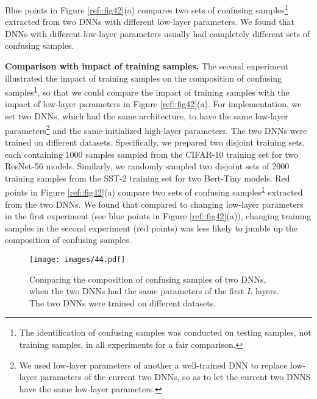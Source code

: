 \documentclass[10pt,twocolumn,letterpaper]{article}
\begin{document}
Blue points in Figure \ref{ref::fig42}(a) compares two sets of confusing samples\footnote[12]{\label{ref::confusing-sample}The identification of confusing samples was conducted on testing samples, not training samples, in all experiments for a fair comparison.} extracted from two DNNs with different low-layer parameters. We found that DNNs with different low-layer parameters usually had completely different sets of confusing samples.


\textbf{Comparison with impact of training samples.} The second experiment illustrated the impact of training samples on the composition of confusing samples\textsuperscript{\ref{ref::confusing-sample}}, so that we could compare the impact of training samples with the impact of low-layer parameters in Figure \ref{ref::fig42}(a).
For implementation, we set two DNNs, which had the same architecture, to have the same low-layer parameters\footnote[13]{\label{ref::fix-a-DNN}We used low-layer parameters of another a well-trained DNN to replace low-layer parameters of the current two DNNs, so as to let the current two DNNS have the same low-layer parameters.} and the same initialized high-layer parameters. The two DNNs were trained on different datasets.
Specifically, we prepared two disjoint training sets, each containing 1000 samples sampled from the CIFAR-10 training set for two ResNet-56 models. Similarly, we randomly sampled two disjoint sets of 2000 training samples from the SST-2 training set for two Bert-Tiny models. Red points in Figure \ref{ref::fig42}(a) compare two sets of confusing samples\textsuperscript{\ref{ref::confusing-sample}} extracted from the two DNNs. We found that compared to changing low-layer parameters in the first experiment (see blue points in Figure \ref{ref::fig42}(a)), changing training samples in the second experiment (red points) was less likely to jumble up the composition of confusing samples.

\begin{figure}[t]
    \centering
    \texttt{[image: images/44.pdf]}
    \vspace{-15pt}
    \caption{Comparing the composition of confusing samples of two DNNs,
    when the two DNNs had the same parameters of the first $L$ layers. The two DNNs were trained on different datasets.}
    \vspace{-5pt}
    \label{ref::fig44}
\end{figure}
\end{document}
